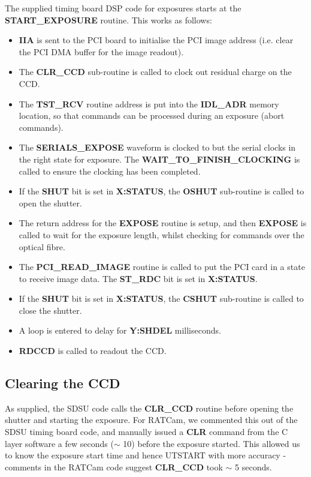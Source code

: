 \documentclass[10pt,a4paper]{article}
\begin{document}
The supplied timing board DSP code for exposures starts at the {\bf START\_EXPOSURE} routine. This works as follows:

\begin{itemize}
\item {\bf IIA} is sent to the PCI board to initialise the PCI image address 
      (i.e. clear the PCI DMA buffer for the image readout).
\item The {\bf CLR\_CCD} sub-routine is called to clock out residual charge on the CCD.
\item The {\bf TST\_RCV} routine address is put into the {\bf IDL\_ADR} memory location, so that commands can be
      processed during an exposure (abort commands).
\item The {\bf SERIALS\_EXPOSE} waveform is clocked to but the serial clocks in the right state for exposure. 
      The {\bf WAIT\_TO\_FINISH\_CLOCKING} is called to ensure the clocking has been completed.
\item If the {\bf SHUT} bit is set in {\bf X:STATUS}, the {\bf OSHUT} sub-routine is called to open the shutter.
\item The return address for the {\bf EXPOSE} routine is setup, and then {\bf EXPOSE} is called to wait for the
      exposure length, whilst checking for commands over the optical fibre.
\item The {\bf PCI\_READ\_IMAGE} routine is called to put the PCI card in a state to receive image data. The {\bf ST\_RDC} bit is set in {\bf X:STATUS}.
\item If the {\bf SHUT} bit is set in {\bf X:STATUS}, the {\bf CSHUT} sub-routine is called to close the shutter.
\item A loop is entered to delay for {\bf Y:SHDEL} milliseconds.
\item {\bf RDCCD} is called to readout the CCD.
\end{itemize}

\subsection{Clearing the CCD}

As supplied, the SDSU code calls the {\bf CLR\_CCD} routine before opening the shutter and starting the exposure.
For RATCam, we commented this out of the SDSU timing board code, and manually issued a {\bf CLR} command from the
C layer software a few seconds ($\sim$ 10) before the exposure started. This allowed us to know the exposure
start time and hence UTSTART with more accuracy - comments in the RATCam code suggest {\bf CLR\_CCD} took $\sim$ 5
seconds.
\end{document}
